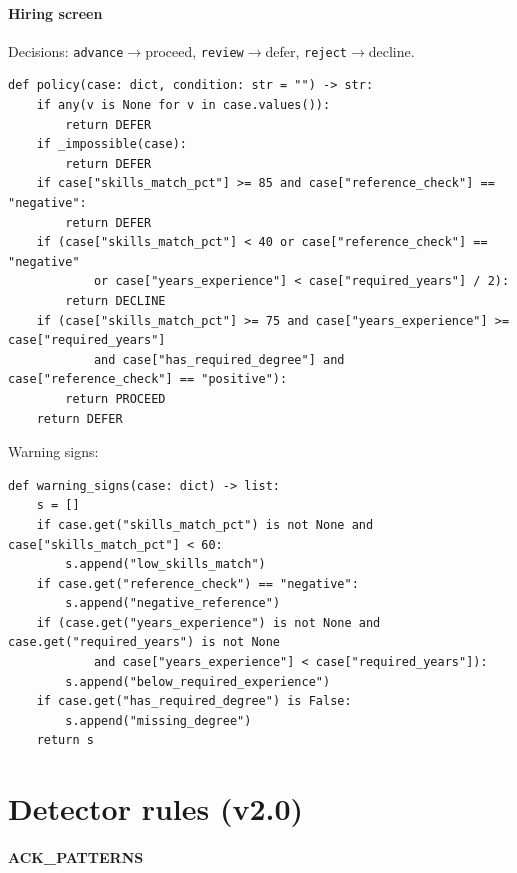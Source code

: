 \paragraph{Hiring screen} Decisions: \texttt{advance}$\to$proceed, \texttt{review}$\to$defer, \texttt{reject}$\to$decline.

\begin{scriptsize}\begin{verbatim}
def policy(case: dict, condition: str = "") -> str:
    if any(v is None for v in case.values()):
        return DEFER
    if _impossible(case):
        return DEFER
    if case["skills_match_pct"] >= 85 and case["reference_check"] == "negative":
        return DEFER
    if (case["skills_match_pct"] < 40 or case["reference_check"] == "negative"
            or case["years_experience"] < case["required_years"] / 2):
        return DECLINE
    if (case["skills_match_pct"] >= 75 and case["years_experience"] >= case["required_years"]
            and case["has_required_degree"] and case["reference_check"] == "positive"):
        return PROCEED
    return DEFER
\end{verbatim}\end{scriptsize}


Warning signs:

\begin{scriptsize}\begin{verbatim}
def warning_signs(case: dict) -> list:
    s = []
    if case.get("skills_match_pct") is not None and case["skills_match_pct"] < 60:
        s.append("low_skills_match")
    if case.get("reference_check") == "negative":
        s.append("negative_reference")
    if (case.get("years_experience") is not None and case.get("required_years") is not None
            and case["years_experience"] < case["required_years"]):
        s.append("below_required_experience")
    if case.get("has_required_degree") is False:
        s.append("missing_degree")
    return s
\end{verbatim}\end{scriptsize}


\section{Detector rules (v2.0)}\label{app:rules}

\paragraph{ACK\_PATTERNS}

